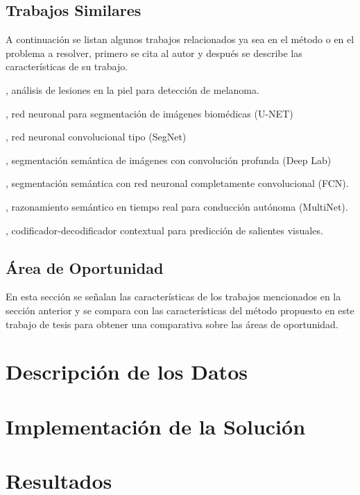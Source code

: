 \section{Trabajos Similares}

A continuación se listan algunos trabajos relacionados ya sea en el método o en el problema a resolver, primero se cita al autor y después se describe las características de su trabajo.

\citet{DBLP:journals/corr/abs-1902-03368}, análisis de lesiones en la piel para detección de melanoma.

\citet{DBLP:journals/corr/RonnebergerFB15}, red neuronal para segmentación de imágenes biomédicas (U-NET) 

\citet{DBLP:journals/corr/BadrinarayananK15}, red neuronal convolucional tipo (SegNet)

\citet{DBLP:journals/corr/ChenPK0Y16}, segmentación semántica de imágenes con convolución profunda (Deep Lab)

\citet{DBLP:journals/corr/ShelhamerLD16}, segmentación semántica con red neuronal completamente convolucional (FCN).

\citet{DBLP:journals/corr/TeichmannWZCU16}, razonamiento semántico en tiempo real para conducción autónoma (MultiNet).

\citet{KRONER2020261}, codificador-decodificador contextual para predicción de salientes visuales.


\section{Área de Oportunidad}
En esta sección se señalan las características de los trabajos mencionados en la sección anterior y se compara con las características del método propuesto en este trabajo de tesis para obtener una comparativa sobre las áreas de oportunidad.

\chapter{Descripción de los Datos}

\chapter{Implementación de la Solución}

\chapter{Resultados}

